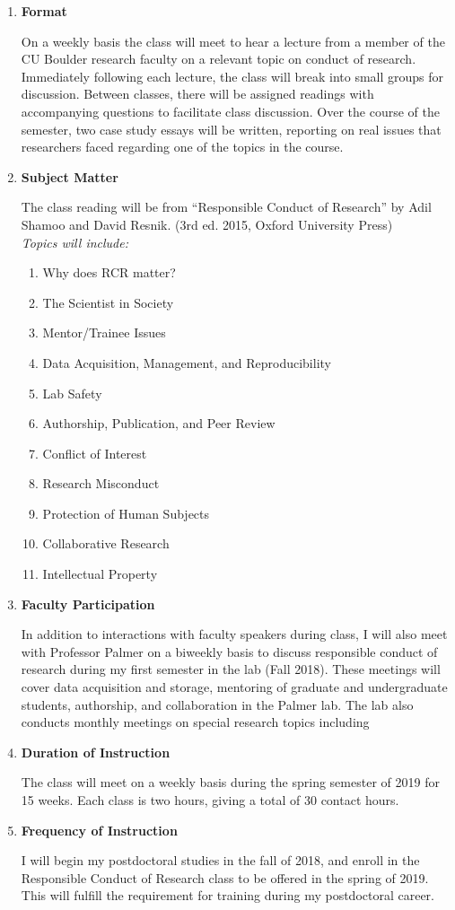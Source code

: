 \begin{enumerate}
  \item{\bf Format}

  On a weekly basis the class will meet to hear a lecture from a member of the CU Boulder research faculty on a relevant topic on conduct of research. Immediately following each lecture, the class will break into small groups for discussion. Between classes, there will be assigned readings with accompanying questions to facilitate class discussion. Over the course of the semester, two case study essays will be written, reporting on real issues that researchers faced regarding one of the topics in the course.
  \item{\bf Subject Matter}

  The class reading will be from ``Responsible Conduct of Research'' by Adil Shamoo and David Resnik. (3rd ed. 2015, Oxford University Press)\\

  \textit{Topics will include:}
  \begin{enumerate}
  \item{Why does RCR matter?}
  \item{The Scientist in Society}
  \item{Mentor/Trainee Issues}
  \item{Data Acquisition, Management, and Reproducibility}
  \item{Lab Safety}
  \item{Authorship, Publication, and Peer Review}
  \item{Conflict of Interest}
  \item{Research Misconduct}
  \item{Protection of Human Subjects}
  \item{Collaborative Research}
  \item{Intellectual Property}
  \end{enumerate}
  \item{\bf Faculty Participation}

  In addition to interactions with faculty speakers during class, I will also meet with Professor Palmer on a biweekly basis to discuss responsible conduct of research during my first semester in the lab (Fall 2018). These meetings will cover data acquisition and storage, mentoring of graduate and undergraduate students, authorship, and collaboration in the Palmer lab. The lab also conducts monthly meetings on special research topics including
  \item{\bf Duration of Instruction}

  The class will meet on a weekly basis during the spring semester of 2019 for 15 weeks. Each class is two hours, giving a total of 30 contact hours.
  \item{\bf Frequency of Instruction}

  I will begin my postdoctoral studies in the fall of 2018, and enroll in the Responsible Conduct of Research class to be offered in the spring of 2019. This will fulfill the requirement for training during my postdoctoral career.
\end{enumerate}

